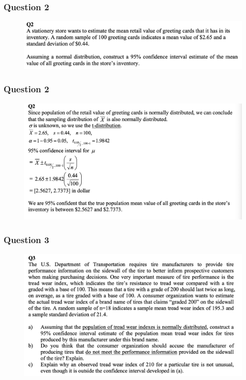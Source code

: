 \documentclass{beamer}
\begin{document}
\begin{frame}
\frametitle{Question 2}

\begin{figure}
	\begin{center}
		\includegraphics[scale=0.30]{Q2.png}
	\end{center}
\end{figure}
\end{frame}
\begin{frame}
\frametitle{Question 2}
\begin{figure}
\begin{center}
	\includegraphics[scale=0.30]{Q2_sol.png}
\end{center}
\end{figure}
\end{frame}
\begin{frame}
\frametitle{Question 3}
\begin{figure}
\begin{center}
	\includegraphics[scale=0.30]{Q3.png}
\end{center}
\end{figure}
\end{frame}
\end{document}
